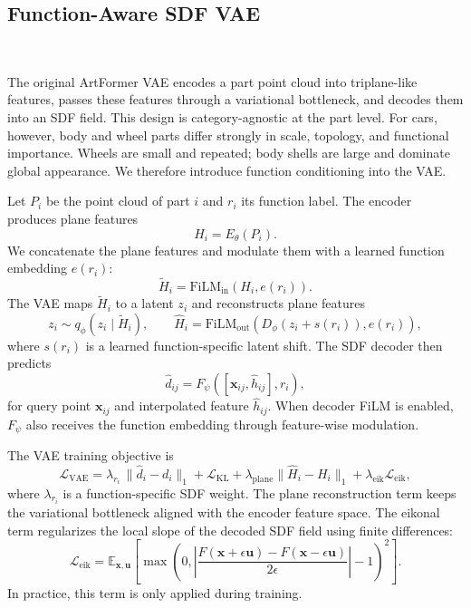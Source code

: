\documentclass[10pt]{article}
\newcommand{\artformer}{ArtFormer\xspace}
\begin{document}
\subsection{Function-Aware SDF VAE}

\ 

The original \artformer VAE encodes a part point cloud into triplane-like features, passes these features through a variational bottleneck, and decodes them into an SDF field. This design is category-agnostic at the part level. For cars, however, body and wheel parts differ strongly in scale, topology, and functional importance. Wheels are small and repeated; body shells are large and dominate global appearance. We therefore introduce function conditioning into the VAE.

Let $P_i$ be the point cloud of part $i$ and $r_i$ its function label. The encoder produces plane features
\begin{equation}
    H_i = E_{\theta}(P_i).
\end{equation}
We concatenate the plane features and modulate them with a learned function embedding $e(r_i)$:
\begin{equation}
    \tilde{H}_i = \mathrm{FiLM}_{\mathrm{in}}(H_i, e(r_i)).
\end{equation}
The VAE maps $\tilde{H}_i$ to a latent $z_i$ and reconstructs plane features
\begin{equation}
    z_i \sim q_{\phi}(z_i \mid \tilde{H}_i), \qquad
    \hat{H}_i = \mathrm{FiLM}_{\mathrm{out}}(D_{\phi}(z_i + s(r_i)), e(r_i)),
\end{equation}
where $s(r_i)$ is a learned function-specific latent shift. The SDF decoder then predicts
\begin{equation}
    \hat{d}_{ij} = F_{\psi}([\mathbf{x}_{ij}, \hat{h}_{ij}], r_i),
\end{equation}
for query point $\mathbf{x}_{ij}$ and interpolated feature $\hat{h}_{ij}$. When decoder FiLM is enabled, $F_{\psi}$ also receives the function embedding through feature-wise modulation.

The VAE training objective is
\begin{equation}
    \mathcal{L}_{\mathrm{VAE}} =
    \lambda_{r_i} \, \|\hat{d}_i - d_i\|_1
    + \mathcal{L}_{\mathrm{KL}}
    + \lambda_{\mathrm{plane}}\|\hat{H}_i - H_i\|_1
    + \lambda_{\mathrm{eik}}\mathcal{L}_{\mathrm{eik}},
\end{equation}
where $\lambda_{r_i}$ is a function-specific SDF weight. The plane reconstruction term keeps the variational bottleneck aligned with the encoder feature space. The eikonal term regularizes the local slope of the decoded SDF field using finite differences:
\begin{equation}
    \mathcal{L}_{\mathrm{eik}} =
    \mathbb{E}_{\mathbf{x},\mathbf{u}}
    \left[\max\left(0, \left|\frac{F(\mathbf{x}+\epsilon\mathbf{u}) - F(\mathbf{x}-\epsilon\mathbf{u})}{2\epsilon}\right| - 1\right)^2\right].
\end{equation}
In practice, this term is only applied during training.
\end{document}
